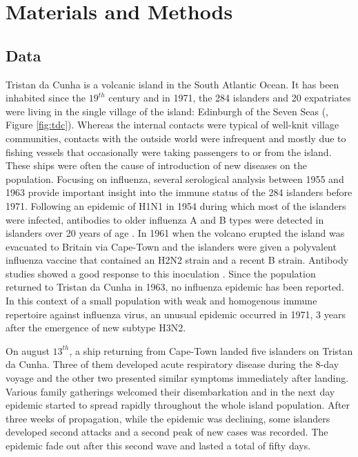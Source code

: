 \section{Materials and Methods}

\subsection{Data}

Tristan da Cunha is a volcanic island in the South Atlantic Ocean. It
has been inhabited since the $19^{th}$ century and in 1971, the 284
islanders and 20 expatriates were living in the single village of the
island: Edinburgh of the Seven Seas (\citet{Samuels1963}, Figure
\ref{fig:tdc}). Whereas the internal contacts were typical of
well-knit village communities, contacts with the outside world were
infrequent and mostly due to fishing vessels that occasionally were
taking passengers to or from the island. These ships were often the
cause of introduction of new diseases on the population. Focusing on
influenza, several serological analysis between 1955 and 1963 provide
important insight into the immune status of the 284 islanders before
1971. Following an epidemic of H1N1 in 1954 during which most of the
islanders were infected, antibodies to older influenza A and B types
were detected in islanders over 20 years of age
\citep{Taylor-Robinson1963}. In 1961 when the volcano erupted the
island was evacuated to Britain via Cape-Town and the islanders were
given a polyvalent influenza vaccine that contained an H2N2 strain and
a recent B strain. Antibody studies showed a good response to this
inoculation \citep{Tyrrell1967}. Since the population returned to
Tristan da Cunha in 1963, no influenza epidemic has been reported. In
this context of a small population with weak and homogenous immune
repertoire against influenza virus, an unusual epidemic occurred in
1971, 3 years after the emergence of new subtype H3N2.

On august $13^{th}$, a ship returning from Cape-Town landed five
islanders on Tristan da Cunha. Three of them developed acute
respiratory disease during the 8-day voyage and the other two
presented similar symptoms immediately after landing. Various family
gatherings welcomed their disembarkation and in the next day epidemic
started to spread rapidly throughout the whole island
population. After three weeks of propagation, while the epidemic was
declining, some islanders developed second attacks and a second peak
of new cases was recorded. The epidemic fade out after this second
wave and lasted a total of fifty days.

